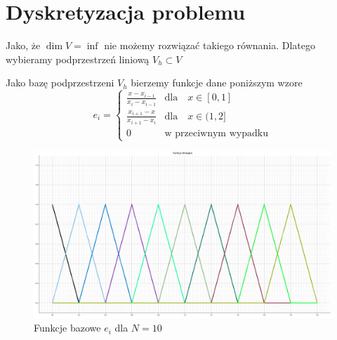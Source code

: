 \documentclass[a4paper]{article}
\begin{document}
  \section{Dyskretyzacja problemu}
  Jako, że $\dim V = \inf$ nie możemy rozwiązać takiego równania. Dlatego wybieramy podprzestrzeń liniową
  $V_h \subset V$
  
  Jako bazę podprzestrzeni $V_h$ bierzemy funkcje dane poniższym wzore
  \[
    e_i = 
    \begin{cases}
        \frac{x - x_{i-1}}{x_i - x_{i-1}}  & \text{dla} \quad x\in [0,1]\\
        \frac{x_{i+1} - x}{x_{i+1} - x_i}  & \text{dla} \quad x\in (1,2] \\
        0 & \text{w przeciwnym wypadku}
    \end{cases}  
  \]
  \begin{figure}[H]
    \includegraphics[width=\textwidth]{test_functions.png}
    \caption{Funkcje bazowe $e_i$ dla $N=10$}
  \end{figure}
\end{document}
